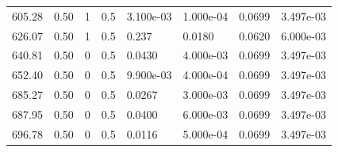 \documentclass[preview]{standalone}
\begin{document}
{{\begin{tabular}{L{1.2cm}C{1.2cm} C{0.3cm}C{0.5cm} C{1.4cm}C{1.4cm} C{1.4cm}C{1.4cm}}
  605.28  &  0.50  & 1     & 0.5 &  3.100e-03  & 1.000e-04  & 0.0699 &  3.497e-03   \\ 
  626.07  &  0.50  & 1     & 0.5 &  0.237  & 0.0180  & 0.0620 &  6.000e-03   \\ 
  640.81  &  0.50  & 0     & 0.5 &  0.0430  & 4.000e-03  & 0.0699 &  3.497e-03   \\ 
  652.40  &  0.50  & 0     & 0.5 &  9.900e-03  & 4.000e-04  & 0.0699 &  3.497e-03   \\ 
  685.27  &  0.50  & 0     & 0.5 &  0.0267  & 3.000e-03  & 0.0699 &  3.497e-03   \\ 
  687.95  &  0.50  & 0     & 0.5 &  0.0400  & 6.000e-03  & 0.0699 &  3.497e-03   \\ 
  696.78  &  0.50  & 0     & 0.5 &  0.0116  & 5.000e-04  & 0.0699 &  3.497e-03   \\ 
\hline 
\end{tabular} 

}}
\end{document}
